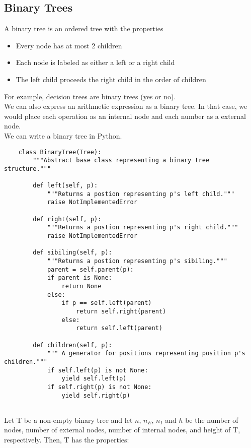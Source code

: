 \documentclass[]{article}
\begin{document}
\subsection{Binary Trees}\bigbreak

A binary tree is an ordered tree with the properties

\begin{itemize}
	\item Every node has at most 2 children
	\item Each node is labeled as either a left or a right child
	\item The left child proceeds the right child in the order of children
\end{itemize}\bigbreak

For example, decision trees are binary trees (yes or no).\\

We can also express an arithmetic expression as a binary tree. In that case, we would place each operation as an internal node and each number as a external node.\\


We can write a binary tree in Python.\\

\begin{lstlisting}
	class BinaryTree(Tree):	
		"""Abstract base class representing a binary tree structure."""
		
		def left(self, p):
			"""Returns a postion representing p's left child."""
			raise NotImplementedError
			
		def right(self, p):
			"""Returns a postion representing p's right child."""
			raise NotImplementedError
			
		def sibiling(self, p):
			"""Returns a postion representing p's sibiling."""
			parent = self.parent(p):
			if parent is None:
				return None
			else:
				if p == self.left(parent)
					return self.right(parent)
				else:
					return self.left(parent)
					
		def children(self, p):
			""" A generator for positions representing position p's children."""
			if self.left(p) is not None:
				yield self.left(p)
			if self.right(p) is not None:
				yield self.right(p)
			
\end{lstlisting}\bigbreak


Let T be a non-empty binary tree and let $n$, $n_E$, $n_I$ and $h$ be the number of nodes, number of external nodes, number of internal nodes, and height of T, respectively. Then, T has the properties:
\end{document}
